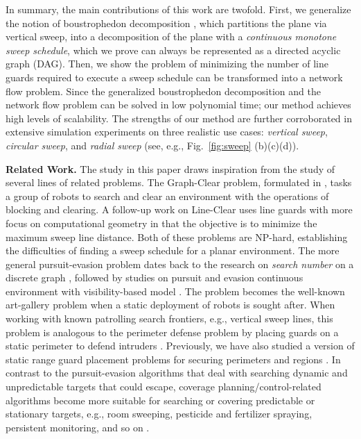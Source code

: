 In summary, the main contributions of this work are twofold. First, we generalize the 
notion of boustrophedon decomposition \cite{choset2000coverage}, which partitions the 
plane via vertical sweep, into a decomposition of the plane with a \emph{continuous 
monotone sweep schedule}, which we prove can always be represented as a directed 
acyclic graph (DAG). 
%
Then, we show the problem of minimizing the number of line guards required to execute a sweep schedule can be transformed into a network flow problem.
%
Since the generalized boustrophedon decomposition and the network flow problem can 
be solved in low polynomial time; our method achieves high levels of scalability.
%
The strengths of our method are further corroborated in extensive simulation experiments 
on three realistic use cases: \emph{vertical sweep}, \emph{circular sweep}, and 
\emph{radial sweep} (see, e.g., Fig.~\ref{fig:sweep} (b)(c)(d)).





\noindent
\textbf{Related Work.}
The study in this paper draws inspiration from the study of several 
lines of related problems. 
The Graph-Clear problem, formulated in \cite{kolling2007graph}, tasks a group of robots to search and clear an environment with the operations of blocking and clearing.
A follow-up work on Line-Clear \cite{kolling2017coordinated} uses line guards
with more focus on computational geometry in that
the objective is to minimize the maximum sweep line distance. Both of these problems are
NP-hard, establishing the difficulties of finding a sweep schedule for a planar environment.
The more general pursuit-evasion problem dates back to the research on \emph{search number}
on a discrete graph \cite{megiddo1988complexity}, 
followed by studies on pursuit and evasion continuous environment with 
visibility-based model \cite{guibas1999visibility, suzuki1992searching, lavalle2000algorithm, stiffler2017persistent}. 
The problem becomes the well-known art-gallery problem \cite{o1987art} when a static deployment of robots is sought after.
%
When working with known patrolling search frontiers, e.g., vertical sweep lines, 
this problem is analogous to the perimeter defense problem by placing guards on a static perimeter
to defend intruders \cite{shishika2020cooperative, macharet2020adaptive, chen2021optimal}.
Previously, we have also studied a version of static range guard placement problems for securing perimeters and regions \cite{feng2020optimally}.
In contrast to the pursuit-evasion algorithms that deal with searching dynamic and unpredictable targets that could escape, 
coverage planning/control-related algorithms become more suitable for searching or covering predictable or stationary targets,
e.g., room sweeping, pesticide and fertilizer spraying, persistent monitoring, and so on \cite{cortes2004coverage, oksanen2009coverage, haksar2020spatial, wei2018coverage, deng2019constrained, lan2013planning, cassandras2012optimal, yu2015persistent, palacios2017optimal}. 

